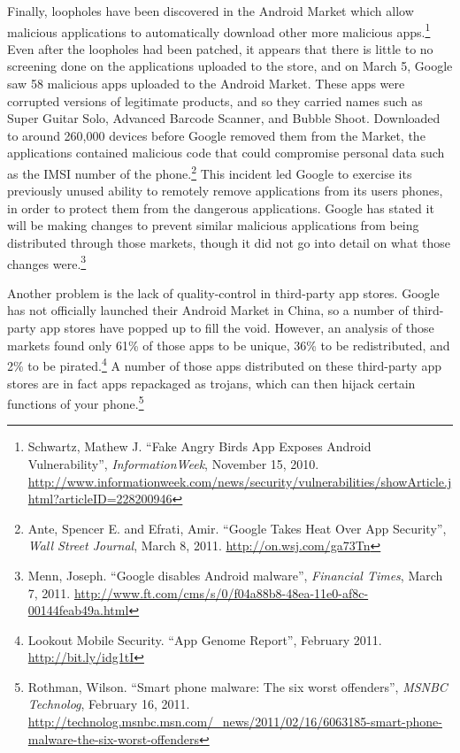 \documentclass[11pt]{article}
\begin{document}
Finally, loopholes have been discovered in the Android Market which allow malicious applications to automatically download other more malicious apps.\footnote{Schwartz, Mathew J. ``Fake Angry Birds App Exposes Android Vulnerability'', \textit{InformationWeek}, November 15, 2010. \url{http://www.informationweek.com/news/security/vulnerabilities/showArticle.jhtml?articleID=228200946}} Even after the loopholes had been patched, it appears that there is little to no screening done on the applications uploaded to the store, and on March 5, Google saw 58 malicious apps uploaded to the Android Market. These apps were corrupted versions of legitimate products, and so they carried names such as Super Guitar Solo, Advanced Barcode Scanner, and Bubble Shoot. Downloaded to around 260,000 devices before Google removed them from the Market, the applications contained malicious code that could compromise personal data such as  the IMSI number of the phone.\footnote{Ante, Spencer E. and Efrati, Amir. ``Google Takes Heat Over App Security'', \textit{Wall Street Journal}, March 8, 2011. \url{http://on.wsj.com/ga73Tn}} This incident led Google to exercise its previously unused ability to remotely remove applications from its users phones, in order to protect them from the dangerous applications. Google has stated it will be making changes to prevent similar malicious applications from being distributed through those markets, though it did not go into detail on what those changes were.\footnote{Menn, Joseph. ``Google disables Android malware'', \textit{Financial Times}, March 7, 2011. \url{http://www.ft.com/cms/s/0/f04a88b8-48ea-11e0-af8c-00144feab49a.html}}

Another problem is the lack of quality-control in third-party app stores. Google has not officially launched their Android Market in China, so a number of third-party app stores have popped up to fill the void. However, an analysis of those markets found only 61\% of those apps to be unique, 36\% to be redistributed, and 2\% to be pirated.\footnote{Lookout Mobile Security. ``App Genome Report'', February 2011. \url{http://bit.ly/idg1tI}} A number of those apps distributed on these third-party app stores are in fact apps repackaged as trojans, which can then hijack certain functions of your phone.\footnote{Rothman, Wilson. ``Smart phone malware: The six worst offenders'', \textit{MSNBC Technolog}, February 16, 2011. \url{http://technolog.msnbc.msn.com/_news/2011/02/16/6063185-smart-phone-malware-the-six-worst-offenders}}
\end{document}
